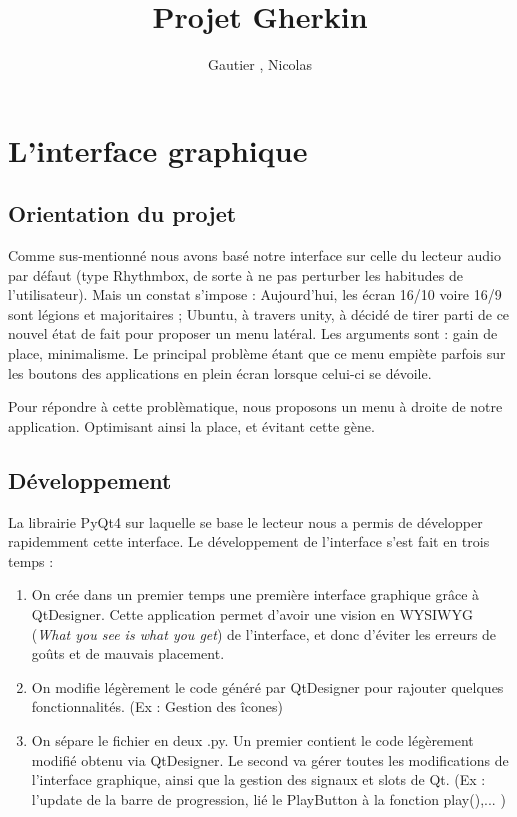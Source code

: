 \documentclass{report}
\author{Gautier \bsc{Dakin}, Nicolas \bsc{Ehrhardt}}
\title{Projet Gherkin}
\begin{document}
\maketitle

\tableofcontents


\chapter{L'interface graphique}
\section{Orientation du projet}
Comme sus-mentionné nous avons basé notre interface sur celle du lecteur audio par défaut (type Rhythmbox, de sorte à ne pas perturber les habitudes de l'utilisateur). Mais un constat s'impose : Aujourd'hui, les écran 16/10 voire 16/9 sont légions et majoritaires ; Ubuntu, à travers unity, à décidé de tirer parti de ce nouvel état de fait pour proposer un menu latéral. Les arguments sont : gain de place, minimalisme. Le principal problème étant que ce menu empiète parfois sur les boutons des applications en plein écran lorsque celui-ci se dévoile.

Pour répondre à cette problèmatique, nous proposons un menu à droite de notre application. Optimisant ainsi la place, et évitant cette gène.

\section{Développement}
La librairie PyQt4 sur laquelle se base le lecteur nous a permis de développer rapidemment cette interface. Le développement de l'interface s'est fait en trois temps :
\begin{enumerate}
\item On crée dans un premier temps une première interface graphique grâce à QtDesigner. Cette application permet d'avoir une vision en WYSIWYG (\emph{What you see is what you get}) de l'interface, et donc d'éviter les erreurs de goûts et de mauvais placement.
\item On modifie légèrement le code généré par QtDesigner pour rajouter quelques fonctionnalités. (Ex : Gestion des îcones)
\item On sépare le fichier en deux .py. Un premier contient le code légèrement modifié obtenu via QtDesigner. Le second va gérer toutes les modifications de l'interface graphique, ainsi que la gestion des signaux et slots de Qt. (Ex : l'update de la barre de progression, lié le PlayButton à la fonction play(),... )
\end{enumerate}
\end{document}
